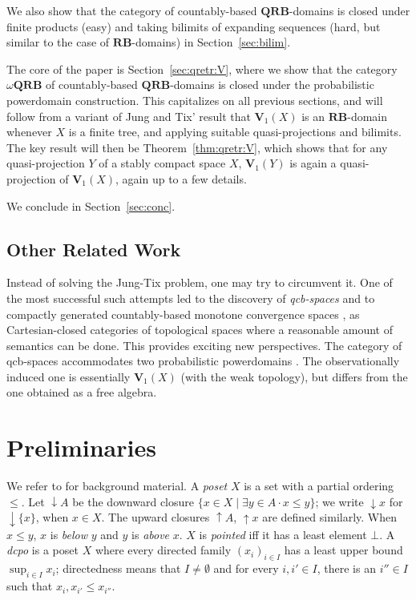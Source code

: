 \documentclass{LMCS}
\newcommand\upc{\mathop{\uparrow}\nolimits}
\newcommand\dc{\mathop{\downarrow}\nolimits}
\newcommand\QRB{\mathbf{QRB}}
\newcommand\RB{\mathbf{RB}}
\newcommand\Val{\mathbf V}
\begin{document}
We also show that the category of countably-based $\QRB$-domains is
closed under finite products (easy) and taking bilimits of expanding
sequences (hard, but similar to the case of $\RB$-domains) in
Section~\ref{sec:bilim}.

The core of the paper is Section~\ref{sec:qretr:V}, where we show that
the category $\omega\QRB$ of countably-based $\QRB$-domains is closed
under the probabilistic powerdomain construction.  This capitalizes on
all previous sections, and will follow from a variant of Jung and Tix'
result that $\Val_1 (X)$ is an $\RB$-domain whenever $X$ is a finite
tree, and applying suitable quasi-projections and bilimits.
The key result will then be Theorem~\ref{thm:qretr:V}, which shows
that for any quasi-projection $Y$ of a stably compact space $X$,
$\Val_1 (Y)$ is again a quasi-projection of $\Val_1 (X)$, again up to
a few details.


We conclude in Section~\ref{sec:conc}.

\subsection{Other Related Work}

Instead of solving the Jung-Tix problem, one may try to circumvent it.
One of the most successful such attempts led to the discovery of {\em
  qcb-spaces\/} \cite{BSS:qcb} and to compactly generated
countably-based monotone convergence spaces \cite{BSS:cgdom}, as
Cartesian-closed categories of topological spaces where a reasonable
amount of semantics can be done.  This provides exciting new
perspectives.  The category of qcb-spaces accommodates two
probabilistic powerdomains \cite{BS:twoval}.  The observationally
induced one is essentially $\Val_1 (X)$ (with the weak topology), but
differs from the one obtained as a free algebra.


\section{Preliminaries}
\label{sec:prelim}

We refer to \cite{AJ:domains,GHKLMS:contlatt,Mislove:topo:CS} for
background material.
A {\em poset\/} $X$ is a set with a partial ordering $\leq$.  Let $\dc
A$ be the downward closure $\{x \in X \mid \exists y \in A \cdot x
\leq y\}$; we write $\dc x$ for $\dc \{x\}$, when $x \in X$.  The
upward closures $\upc A$, $\upc x$ are defined similarly.  When $x
\leq y$, $x$ is {\em below\/} $y$ and $y$ is {\em above\/} $x$.  $X$
is {\em pointed\/} iff it has a least element $\bot$.  A {\em dcpo\/}
is a poset $X$ where every directed family ${(x_i)}_{i \in I}$ has a
least upper bound $\sup_{i \in I} x_i$; directedness means that $I\neq
\emptyset$ and for every $i, i' \in I$, there is an $i'' \in I$ such
that $x_i, x_{i'} \leq x_{i''}$.
\end{document}

